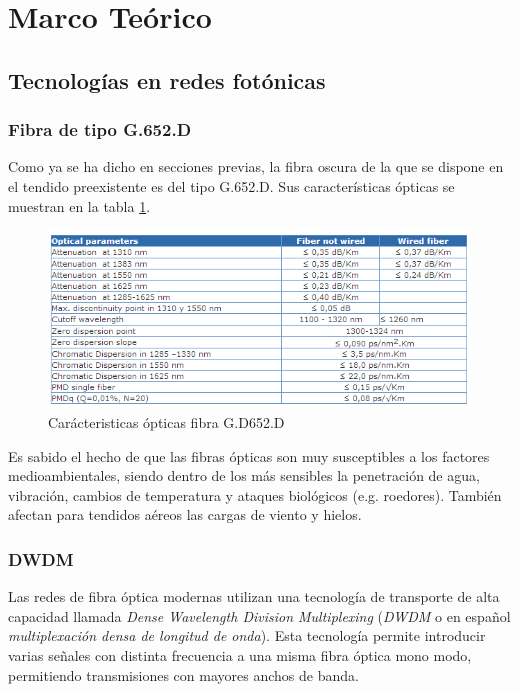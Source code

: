 
\section{Marco Te\'orico}
\label{sec:marcoteorico}

\subsection{Tecnolog\'ias en redes fot\'onicas}
\label{sec:redfotonica}

\subsubsection{Fibra de tipo G.652.D}

Como ya se ha dicho en secciones previas, la fibra oscura de la que se
dispone en el tendido preexistente es del tipo G.652.D. Sus
características ópticas se muestran en la tabla \ref{fig:tablafibra}.

\begin{figure}[H]
  \centering
  \includegraphics[scale=1]{Imagenes/Fibra.png}
  \caption{Carácteristicas ópticas fibra G.D652.D \cite{datasheetfibra}}
  \label{fig:tablafibra}
\end{figure}
  
Es sabido el hecho de que las fibras ópticas son muy susceptibles a
los factores medioambientales, siendo dentro de los más sensibles la
penetración de agua, vibración, cambios de temperatura y ataques
biológicos (e.g. roedores). También afectan para tendidos
aéreos las cargas de viento y hielos.

\subsubsection{DWDM}
\label{sec:dwdm}

Las redes de fibra óptica modernas utilizan una tecnología de
transporte de alta capacidad llamada \emph{Dense Wavelength Division
Multiplexing} (\emph{DWDM} o en español \emph{multiplexación densa de 
longitud de onda}). Esta tecnología permite introducir varias señales 
con distinta frecuencia a una misma fibra óptica mono modo, permitiendo 
transmisiones con mayores anchos de banda.\cite{dwdm1}\cite{dwdm2}

